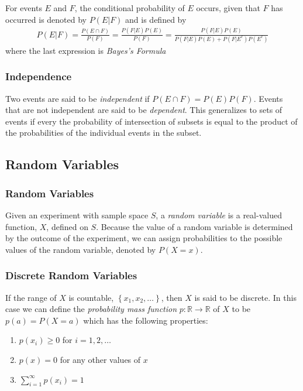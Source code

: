 \documentclass[10pt]{article}
\begin{document}
		For events $E$ and $F$, the conditional probability of $E$ occurs, given that $F$ has occurred is denoted by  $P(E|F)$ and is defined by
		\begin{align*}
			P(E|F) 
				= \frac{P(E\cap F)}{P(F)}
				= \frac{P(F|E)P(E)}{P(F)}
				= \frac{P(F|E)P(E)}{P(F|E)P(E)+P(F|E^c)P(E^c)}
		\end{align*}
		where the last expression is \emph{Bayes's Formula}
		
		\subsubsection*{Independence}
		
		Two events are said to be \emph{independent} if $P(E\cap F) = P(E)P(F)$. Events that are not independent are said to be \emph{dependent}.  This generalizes to sets of events if every the probability of intersection of subsets is equal to the product of the probabilities of the individual events in the subset.
		
		\subsection{Random Variables}
		
		\subsubsection*{Random Variables}
		
		Given an experiment with sample space $S$, a \emph{random variable} is a real-valued function, $X$, defined on $S$. Because the value of a random variable is determined by the outcome of the experiment, we can assign probabilities to the possible values of the random variable, denoted by $P(X=x)$.
		
		\subsubsection*{Discrete Random Variables}
		If the range of $X$ is countable, $\left\{ x_1, x_2, \ldots \right\}$, then $X$ is said to be discrete. In this case we can define the \emph{probability mass function} $p:\mathbb{R}\to\mathbb{R}$ of $X$ to be $p(a) = P(X=a)$ which has the following properties:
		\begin{multicols}{3}
			\begin{enumerate}
				\item $p(x_i) \geq 0$ for $i=1,2,\ldots$
				\item $p(x) = 0$ for any other values of $x$
				\item $\sum_{i=1}^{\infty}p(x_i) = 1$
			\end{enumerate}
		\end{multicols}
		
\end{document}
